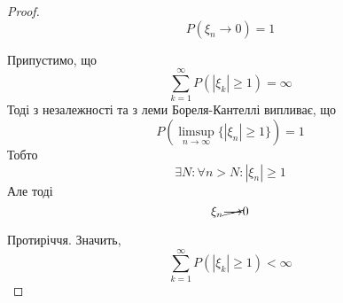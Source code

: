 \documentclass[11pt, a4paper]{article} %
\begin{document}
\begin{proof}
    $$P(\xi_n \to 0) = 1$$
    
    Припустимо, що $$\sum_{k=1}^\infty P(|\xi_k|\ge 1) = \infty$$
    Тоді з незалежності та з леми Бореля-Кантеллі випливає, що 
    $$P(\limsup_{n\to\infty} \{|\xi_n|\ge 1\}) = 1$$
    Тобто
    $$\exists N: \forall n>N: |\xi_n|\ge 1$$
    Але тоді $$\xi_n \cancel{\longrightarrow} 0$$

    Протиріччя.
    Значить, $$\sum_{k=1}^\infty P(|\xi_k|\ge 1) < \infty$$
\end{proof}
\end{document}
